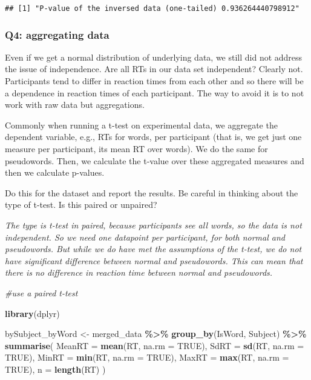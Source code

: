 \documentclass[
]{article}
\newenvironment{Shaded}{\begin{snugshade}}{\end{snugshade}}
\newcommand{\AttributeTok}[1]{\textcolor[rgb]{0.13,0.29,0.53}{#1}}
\newcommand{\CommentTok}[1]{\textcolor[rgb]{0.56,0.35,0.01}{\textit{#1}}}
\newcommand{\ConstantTok}[1]{\textcolor[rgb]{0.56,0.35,0.01}{#1}}
\newcommand{\FunctionTok}[1]{\textcolor[rgb]{0.13,0.29,0.53}{\textbf{#1}}}
\newcommand{\NormalTok}[1]{#1}
\newcommand{\OtherTok}[1]{\textcolor[rgb]{0.56,0.35,0.01}{#1}}
\newcommand{\SpecialCharTok}[1]{\textcolor[rgb]{0.81,0.36,0.00}{\textbf{#1}}}
\begin{document}
\begin{verbatim}
## [1] "P-value of the inversed data (one-tailed) 0.936264440798912"
\end{verbatim}

\hypertarget{q4-aggregating-data}{%
\subsubsection{Q4: aggregating data}\label{q4-aggregating-data}}

Even if we get a normal distribution of underlying data, we still did
not address the issue of independence. Are all RTs in our data set
independent? Clearly not. Participants tend to differ in reaction times
from each other and so there will be a dependence in reaction times of
each participant. The way to avoid it is to not work with raw data but
aggregations.

Commonly when running a t-test on experimental data, we aggregate the
dependent variable, e.g., RTs for words, per participant (that is, we
get just one measure per participant, its mean RT over words). We do the
same for pseudowords. Then, we calculate the t-value over these
aggregated measures and then we calculate p-values.

Do this for the dataset and report the results. Be careful in thinking
about the type of t-test. Is this paired or unpaired?

\emph{The type is t-test in paired, because participants see all words,
so the data is not independent. So we need one datapoint per
participant, for both normal and pseudowords. But while we do have met
the assumptions of the t-test, we do not have significant difference
between normal and pseudowords. This can mean that there is no
difference in reaction time between normal and pseudowords.}

\begin{Shaded}
\begin{Highlighting}[]
\CommentTok{\#use a paired t{-}test}

\FunctionTok{library}\NormalTok{(dplyr)}

\NormalTok{bySubject\_byWord }\OtherTok{\textless{}{-}}\NormalTok{ merged\_data  }\SpecialCharTok{\%\textgreater{}\%}
  \FunctionTok{group\_by}\NormalTok{(IsWord, Subject) }\SpecialCharTok{\%\textgreater{}\%}
  \FunctionTok{summarise}\NormalTok{(}
    \AttributeTok{MeanRT =} \FunctionTok{mean}\NormalTok{(RT, }\AttributeTok{na.rm =} \ConstantTok{TRUE}\NormalTok{),}
    \AttributeTok{SdRT =} \FunctionTok{sd}\NormalTok{(RT, }\AttributeTok{na.rm =} \ConstantTok{TRUE}\NormalTok{),}
    \AttributeTok{MinRT =} \FunctionTok{min}\NormalTok{(RT, }\AttributeTok{na.rm =} \ConstantTok{TRUE}\NormalTok{),}
    \AttributeTok{MaxRT =} \FunctionTok{max}\NormalTok{(RT, }\AttributeTok{na.rm =} \ConstantTok{TRUE}\NormalTok{),}
    \AttributeTok{n =} \FunctionTok{length}\NormalTok{(RT)}
\NormalTok{  )}
\end{Highlighting}
\end{Shaded}
\end{document}
